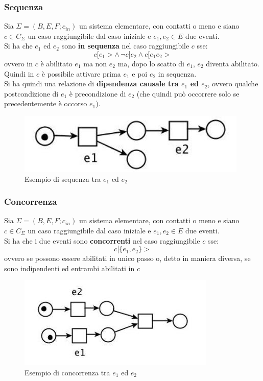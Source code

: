 \documentclass[a4paper,12pt, oneside]{book}
\begin{document}
\subsubsection{Sequenza}
\begin{definizione}
  Sia $\Sigma = (B,E,F;c_{in})$ un sistema elementare, con contatti o meno
  e siano $c\in C_\Sigma$ un caso raggiungibile dal caso iniziale e $e_1,e_2\in
  E$ due eventi.\\
  Si ha che $e_1$ ed $e_2$ sono \textbf{in sequenza} nel caso
  raggiungibile $c$ sse:
  \[c[e_1>\wedge\, \neg c[e_2\wedge c[e_1e_2>\]
  ovvero in $c$ è abilitato $e_1$ ma non $e_2$ ma, dopo lo scatto di $e_1$,
  $e_2$ diventa abilitato. Quindi in $c$ è possibile attivare prima $e_1$ e poi
  $e_2$ in sequenza.\\
  Si ha quindi una relazione di \textbf{dipendenza causale tra $e_1$ ed $e_2$},
  ovvero qualche postcondizione di $e_1$ è precondizione di $e_2$ (che quindi
  può occorrere solo se precedentemente è occorso $e_1$).
  \begin{figure}[H]
    \centering
    \includegraphics[scale = 0.6]{img/se.jpg}
    \caption{Esempio di sequenza tra $e_1$ ed $e_2$}
  \end{figure}
\end{definizione}
\subsubsection{Concorrenza}
\begin{definizione}
  Sia $\Sigma = (B,E,F;c_{in})$ un sistema elementare, con contatti o meno
  e siano $c\in C_\Sigma$ un caso raggiungibile dal caso iniziale e $e_1,e_2\in
  E$ due eventi. \\
  Si ha che i due eventi sono \textbf{concorrenti} nel caso
  raggiungibile $c$ sse:
  \[c[\{e_1,e_2\}>\]
  ovvero se possono essere abilitati in unico passo o, detto in maniera
  diversa, se sono indipendenti ed entrambi abilitati in $c$
  \begin{figure}[H]
    \centering
    \includegraphics[scale = 0.7]{img/conc.jpg}
    \caption{Esempio di concorrenza tra $e_1$ ed $e_2$}
  \end{figure}
\end{definizione}
\end{document}
